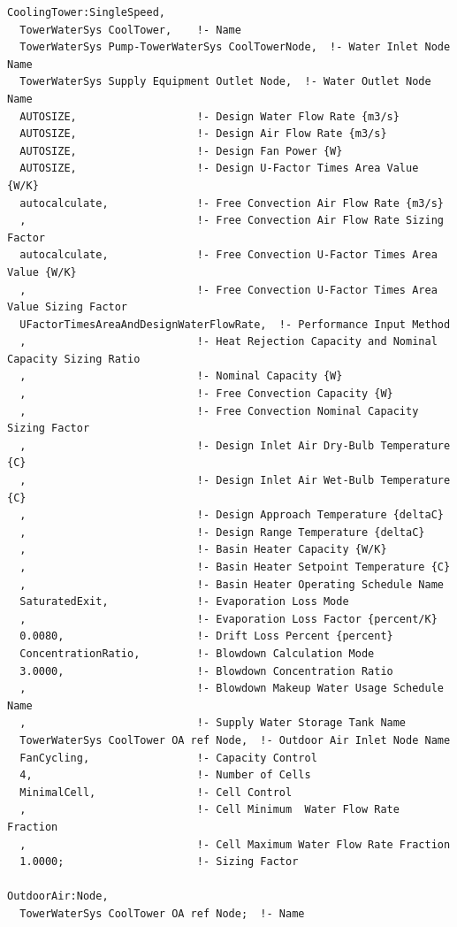 \begin{lstlisting}
CoolingTower:SingleSpeed,
  TowerWaterSys CoolTower,    !- Name
  TowerWaterSys Pump-TowerWaterSys CoolTowerNode,  !- Water Inlet Node Name
  TowerWaterSys Supply Equipment Outlet Node,  !- Water Outlet Node Name
  AUTOSIZE,                   !- Design Water Flow Rate {m3/s}
  AUTOSIZE,                   !- Design Air Flow Rate {m3/s}
  AUTOSIZE,                   !- Design Fan Power {W}
  AUTOSIZE,                   !- Design U-Factor Times Area Value {W/K}
  autocalculate,              !- Free Convection Air Flow Rate {m3/s}
  ,                           !- Free Convection Air Flow Rate Sizing Factor
  autocalculate,              !- Free Convection U-Factor Times Area Value {W/K}
  ,                           !- Free Convection U-Factor Times Area Value Sizing Factor
  UFactorTimesAreaAndDesignWaterFlowRate,  !- Performance Input Method
  ,                           !- Heat Rejection Capacity and Nominal Capacity Sizing Ratio
  ,                           !- Nominal Capacity {W}
  ,                           !- Free Convection Capacity {W}
  ,                           !- Free Convection Nominal Capacity Sizing Factor
  ,                           !- Design Inlet Air Dry-Bulb Temperature {C}
  ,                           !- Design Inlet Air Wet-Bulb Temperature {C}
  ,                           !- Design Approach Temperature {deltaC}
  ,                           !- Design Range Temperature {deltaC}
  ,                           !- Basin Heater Capacity {W/K}
  ,                           !- Basin Heater Setpoint Temperature {C}
  ,                           !- Basin Heater Operating Schedule Name
  SaturatedExit,              !- Evaporation Loss Mode
  ,                           !- Evaporation Loss Factor {percent/K}
  0.0080,                     !- Drift Loss Percent {percent}
  ConcentrationRatio,         !- Blowdown Calculation Mode
  3.0000,                     !- Blowdown Concentration Ratio
  ,                           !- Blowdown Makeup Water Usage Schedule Name
  ,                           !- Supply Water Storage Tank Name
  TowerWaterSys CoolTower OA ref Node,  !- Outdoor Air Inlet Node Name
  FanCycling,                 !- Capacity Control
  4,                          !- Number of Cells
  MinimalCell,                !- Cell Control
  ,                           !- Cell Minimum  Water Flow Rate Fraction
  ,                           !- Cell Maximum Water Flow Rate Fraction
  1.0000;                     !- Sizing Factor

OutdoorAir:Node,
  TowerWaterSys CoolTower OA ref Node;  !- Name
\end{lstlisting}

